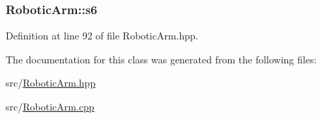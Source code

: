 \subsubsection[{\texorpdfstring{s6}{s6}}]{ Robotic\+Arm\+::s6}\hypertarget{class_robotic_arm_a4816473ed62d262e2a29590769e82f10}{}\label{class_robotic_arm_a4816473ed62d262e2a29590769e82f10}


Definition at line 92 of file Robotic\+Arm.\+hpp.



The documentation for this class was generated from the following files\+:\begin{DoxyCompactItemize}
\item 
src/\hyperlink{_robotic_arm_8hpp}{Robotic\+Arm.\+hpp}\item 
src/\hyperlink{_robotic_arm_8cpp}{Robotic\+Arm.\+cpp}\end{DoxyCompactItemize}
